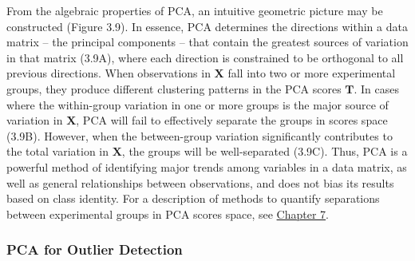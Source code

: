 \begin{doublespace}
From the algebraic properties of PCA, an intuitive geometric picture may be
constructed (Figure 3.9). In essence, PCA determines the directions within
a data matrix -- the principal components -- that contain the greatest sources
of variation in that matrix (3.9A), where each direction is constrained
to be orthogonal to all previous directions. When observations in $\mathbf{X}$
fall into two or more experimental groups, they produce different clustering
patterns in the PCA scores $\mathbf{T}$. In cases where the within-group
variation in one or more groups is the major source of variation in
$\mathbf{X}$, PCA will fail to effectively separate the groups in scores space
(3.9B). However, when the between-group variation significantly contributes to
the total variation in $\mathbf{X}$, the groups will be well-separated (3.9C).
Thus, PCA is a powerful method of identifying major trends among variables in
a data matrix, as well as general relationships between observations, and does
not bias its results based on class identity. For a description of methods to
quantify separations between experimental groups in PCA scores space, see
\hyperlink{chapter.7}{Chapter 7}.
\end{doublespace}

\subsubsection{PCA for Outlier Detection}

